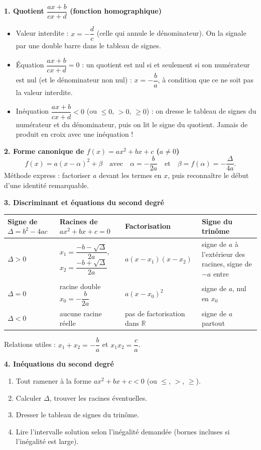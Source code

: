 \documentclass[11pt]{article}
\newcommand{\cle}[1]{{\popxbold\color{popdark}#1}}
\begin{document}
\begin{bilan}
\textbf{1. Quotient $\dfrac{ax+b}{cx+d}$ (fonction homographique)}
\begin{itemize}
  \item \cle{Valeur interdite} : $x=-\dfrac{d}{c}$ (celle qui annule le dénominateur). On la signale par une double barre dans le tableau de signes.
  \item Équation $\dfrac{ax+b}{cx+d}=0$ : un quotient est nul si et seulement si son \cle{numérateur est nul} (et le dénominateur non nul) : $x=-\dfrac{b}{a}$, à condition que ce ne soit pas la valeur interdite.
  \item Inéquation $\dfrac{ax+b}{cx+d}<0$ (ou $\leq 0$, $>0$, $\geq 0$) : on dresse le \cle{tableau de signes} du numérateur et du dénominateur, puis on lit le signe du quotient. Jamais de produit en croix avec une inéquation !
\end{itemize}

\textbf{2. Forme canonique de $f(x)=ax^2+bx+c$ ($a\neq 0$)}
\[ f(x)=a(x-\alpha)^2+\beta \quad \text{avec} \quad \alpha=-\frac{b}{2a} \quad \text{et} \quad \beta=f(\alpha)=-\frac{\Delta}{4a}. \]
Méthode express : factoriser $a$ devant les termes en $x$, puis reconnaître le début d'une identité remarquable.

\textbf{3. Discriminant et équations du second degré}
\begin{center}
\begin{tabularx}{\linewidth}{|l|X|X|X|}\hline
\rowcolor{popblueL} Signe de $\Delta=b^2-4ac$ & Racines de $ax^2+bx+c=0$ & Factorisation & Signe du trinôme \\ \hline
$\Delta>0$ & $x_1=\dfrac{-b-\sqrt{\Delta}}{2a}$, $x_2=\dfrac{-b+\sqrt{\Delta}}{2a}$ & $a(x-x_1)(x-x_2)$ & signe de $a$ à l'extérieur des racines, signe de $-a$ entre \\ \hline
$\Delta=0$ & racine double $x_0=-\dfrac{b}{2a}$ & $a(x-x_0)^2$ & signe de $a$, nul en $x_0$ \\ \hline
$\Delta<0$ & aucune racine réelle & pas de factorisation dans $\mathbb{R}$ & signe de $a$ partout \\ \hline
\end{tabularx}
\end{center}
Relations utiles : $x_1+x_2=-\dfrac{b}{a}$ et $x_1 x_2=\dfrac{c}{a}$.

\textbf{4. Inéquations du second degré}
\begin{enumerate}
  \item Tout ramener à la forme $ax^2+bx+c<0$ (ou $\leq$, $>$, $\geq$).
  \item Calculer $\Delta$, trouver les racines éventuelles.
  \item Dresser le tableau de signes du trinôme.
  \item Lire l'intervalle solution selon l'inégalité demandée (bornes incluses si l'inégalité est large).
\end{enumerate}


\end{bilan}
\end{document}
